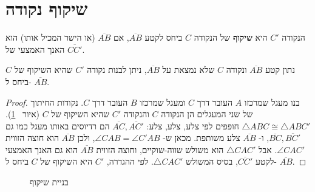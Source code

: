 
\section{שיקוף נקודה}\label{s.reflection}

\begin{definition}
הנקודה
$C'$
היא
\textbf{%
שיקוף%
}
של הנקודה
$C$
ביחס לקטע 
$\overline{AB}$,
אם 
$\overline{AB}$
(או הישר המכיל אותו) הוא האנך האמצעי של
$\overline{CC'}$.
\end{definition}
\begin{theorem}\label{thm.reflection}
נתון קטע 
$\overline{AB}$
ונקודה 
$C$
שלא נמצאת על
$\overline{AB}$,
ניתן לבנות נקודה 
$C'$
שהיא השיקוף של
$C$
ביחס ל-%
$\overline{AB}$.
\end{theorem}

\begin{proof}
בנו מעגל שמרכזו
$A$
העובר דרך
$C$
ומעגל שמרכזו
$B$
העובר דרך
$C$.
נקודות החיתוך של שני המעגלים הן הנקודה
$C$
והנקודה
$C'$
שהיא השיקוף של
$C$
(איור%
~\ref{f.compass-reflection}).
$\triangle ABC\cong\triangle ABC'$
חופפים לפי צלע, צלע, צלע:
$\overline{AC},\overline{AC'}$
הם רדיוסים באותו מעגל כמו גם
$\overline{BC},\overline{BC'}$,
ו-%
$\overline{AB}$
צלע משותפת. מכאן ש-%
$\angle CAB = \angle C'AB$,
ולכן
$\overline{AB}$
הוא חוצה הזווית 
$\angle CAC'$.
אבל
$\triangle CAC'$
הוא משולש שווה-שוקיים, וחוצה הזווית
$\overline{AB}$
הוא גם האנך האמצעי לקטע
$\overline{CC'}$,
בסיס המשולש
$\triangle CAC'$.
לפי ההגדרה, 
$C'$
היא השיקוף של
$C$
ביחס ל-%
$\overline{AB}$.
\end{proof}

\begin{figure}[tb]
\begin{center}
\caption{בניית שיקוף}\label{f.compass-reflection}
\end{center}
\end{figure}


